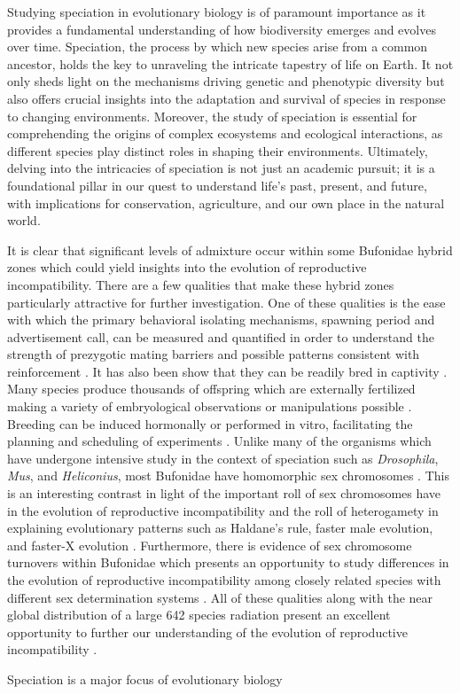 Studying speciation in evolutionary biology is of paramount importance as it 
provides a fundamental understanding of how biodiversity emerges and evolves 
over time. 
Speciation, the process by which new species arise from a common ancestor, holds 
the key to unraveling the intricate tapestry of life on Earth.
It not only sheds light on the mechanisms driving genetic and phenotypic 
diversity but also offers crucial insights into the adaptation and survival of 
species in response to changing environments. 
Moreover, the study of speciation is essential for comprehending the origins of 
complex ecosystems and ecological interactions, as different species play distinct 
roles in shaping their environments. Ultimately, delving into the intricacies of 
speciation is not just an academic pursuit; it is a foundational pillar in our 
quest to understand life's past, present, and future, with implications for 
conservation, agriculture, and our own place in the natural world.



It is clear that significant levels of admixture occur within some Bufonidae 
hybrid zones which could yield insights into the evolution of reproductive incompatibility. 
There are a few qualities that make these hybrid zones particularly attractive for further investigation.
One of these qualities is the ease with which the primary behavioral isolating mechanisms, 
spawning period and advertisement call, can be measured and quantified in order 
to understand the strength of prezygotic mating barriers and possible patterns 
consistent with reinforcement \parencite{cocroft1995,blair1974,kennedy1962}.
It has also been show that they can be readily bred in captivity \parencite{blair1972}. 
Many species produce thousands of offspring which are externally fertilized  
making a variety of embryological observations or manipulations possible \parencite{blair1972}.
Breeding can be induced hormonally or performed in vitro, facilitating the 
planning and scheduling of experiments \parencite{trudeau2010}.
Unlike many of the organisms which have undergone intensive study in the context 
of speciation such as \textit{Drosophila}, \textit{Mus}, and \textit{Heliconius},
most Bufonidae have homomorphic sex chromosomes \parencite{blair1972}. 
This is an interesting contrast in light of the important roll of sex chromosomes
have in the evolution of reproductive incompatibility and the roll of heterogamety
in explaining evolutionary patterns such as Haldane's rule, faster male evolution,
and faster-X evolution \parencite{delph2016}. 
Furthermore, there is evidence of sex chromosome turnovers within Bufonidae
which presents an opportunity to study differences in the evolution of  
reproductive incompatibility among closely related species with different 
sex determination systems \parencite{dufresnes2020,stock2011}. 
All of these qualities along with the near global distribution of a large 642 species  
radiation present an excellent opportunity to further our understanding of the 
evolution of reproductive incompatibility \parencite{amphibiaweb2023}.



Speciation is a major focus of evolutionary biology

